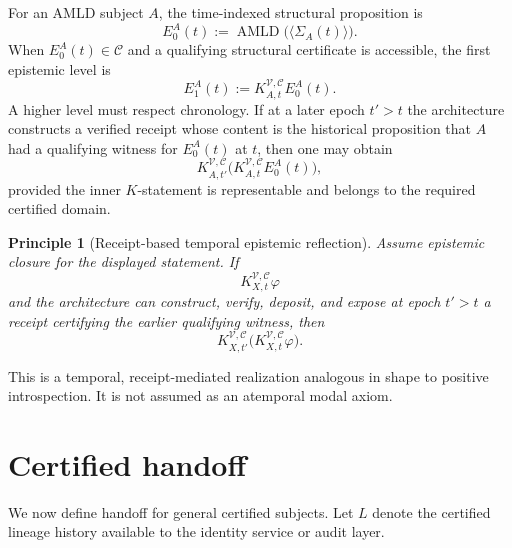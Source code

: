 \documentclass[11pt]{article}
\newtheorem{principle}[definition]{Principle}
\theoremstyle{remark}
\newcommand{\AMLD}{\operatorname{AMLD}}
\newcommand{\K}[4]{K^{#3,#4}_{#1,#2}}
\begin{document}
For an AMLD subject $A$, the time-indexed structural proposition is
\[
E^A_0(t):=\AMLD\bigl(\langle\Sigma_A(t)\rangle\bigr).
\]
When $E^A_0(t)\in\mathcal C$ and a qualifying structural certificate is accessible, the first epistemic level is
\[
E^A_1(t):=\K{A}{t}{\mathcal V}{\mathcal C}E^A_0(t).
\]
A higher level must respect chronology. If at a later epoch $t'>t$ the architecture constructs a verified receipt whose content is the historical proposition that $A$ had a qualifying witness for $E^A_0(t)$ at $t$, then one may obtain
\[
\K{A}{t'}{\mathcal V}{\mathcal C}\bigl(\K{A}{t}{\mathcal V}{\mathcal C}E^A_0(t)\bigr),
\]
provided the inner $K$-statement is representable and belongs to the required certified domain.

\begin{principle}[Receipt-based temporal epistemic reflection]
Assume epistemic closure for the displayed statement. If
\[
\K{X}{t}{\mathcal V}{\mathcal C}\varphi
\]
and the architecture can construct, verify, deposit, and expose at epoch $t'>t$ a receipt certifying the earlier qualifying witness, then
\[
\K{X}{t'}{\mathcal V}{\mathcal C}
\bigl(\K{X}{t}{\mathcal V}{\mathcal C}\varphi\bigr).
\]
\end{principle}

This is a temporal, receipt-mediated realization analogous in shape to positive introspection. It is not assumed as an atemporal modal axiom.

\section{Certified handoff}

We now define handoff for general certified subjects. Let $L$ denote the certified lineage history available to the identity service or audit layer.
\end{document}
